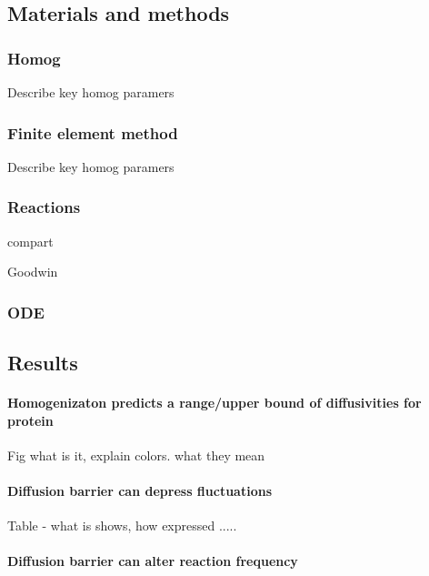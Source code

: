 \subsection{Materials and methods}
\subsubsection{Homog}
Describe key homog paramers

\subsubsection{Finite element method} 
Describe key homog paramers

\subsubsection{Reactions} 
\lbi
\item compart
\item Goodwin 
\lei

\subsubsection{ODE} 


\subsection{Results}

\paragraph*{Homogenizaton predicts a range/upper bound of diffusivities for protein} 
Fig what is it, explain colors. what they mean

\paragraph*{Diffusion barrier can depress fluctuations} 
Table - what is shows, how expressed
.....
\paragraph*{Diffusion barrier can alter reaction frequency} 


